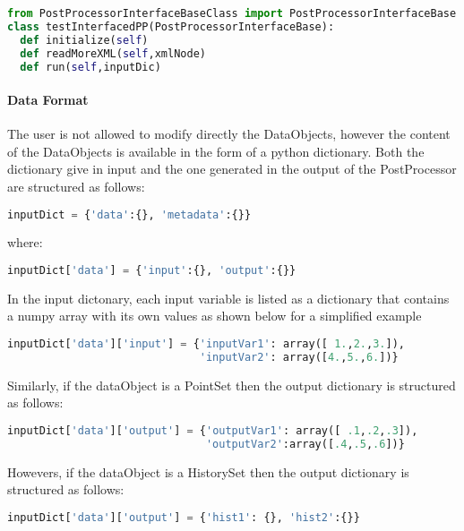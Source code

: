 \begin{lstlisting}[language=python]
from PostProcessorInterfaceBaseClass import PostProcessorInterfaceBase
class testInterfacedPP(PostProcessorInterfaceBase):
  def initialize(self)
  def readMoreXML(self,xmlNode)
  def run(self,inputDic)
\end{lstlisting}

\paragraph{Data Format}
The user is not allowed to modify directly the DataObjects, however the
content of the DataObjects is available in the form of a python dictionary.
Both the dictionary give in input and the one generated in the output of the
PostProcessor are structured as follows:

\begin{lstlisting}[language=python]
inputDict = {'data':{}, 'metadata':{}}
\end{lstlisting}

where:

\begin{lstlisting}[language=python]
inputDict['data'] = {'input':{}, 'output':{}}
\end{lstlisting}

In the input dictonary, each input variable is listed as a dictionary that
contains a numpy array with its own values as shown below for a simplified
example

\begin{lstlisting}[language=python]
inputDict['data']['input'] = {'inputVar1': array([ 1.,2.,3.]),
                              'inputVar2': array([4.,5.,6.])}
\end{lstlisting}

Similarly, if the dataObject is a PointSet then the output dictionary is
structured as follows:

\begin{lstlisting}[language=python]
inputDict['data']['output'] = {'outputVar1': array([ .1,.2,.3]),
                               'outputVar2':array([.4,.5,.6])}
\end{lstlisting}

Howevers, if the dataObject is a HistorySet then the output dictionary is
structured as follows:

\begin{lstlisting}[language=python]
inputDict['data']['output'] = {'hist1': {}, 'hist2':{}}
\end{lstlisting}

